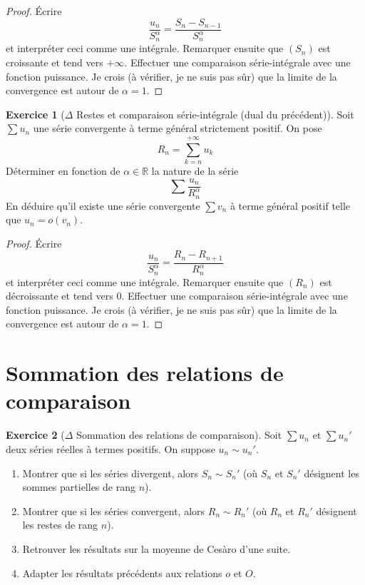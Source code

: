 \documentclass[french]{book}
\newcommand{\R}{\mathbb{R}}
\theoremstyle{definition}
\newtheorem{ex}{Exercice}[chapter]
\theoremstyle{theorem}
\theoremstyle{remark}
\begin{document}
\begin{proof}
	Écrire $$\frac{u_n}{S_n^\alpha}=\frac{S_n-S_{n-1}}{S_n^\alpha}$$ et interpréter ceci comme une intégrale. Remarquer ensuite que $(S_n)$ est croissante et tend vers $+\infty$. Effectuer une comparaison série-intégrale avec une fonction puissance. Je crois (à vérifier, je ne suis pas sûr) que la limite de la convergence est autour de $\alpha=1$.
\end{proof}

\begin{ex}[$\Delta$ Restes et comparaison série-intégrale (dual du précédent)]
	Soit $\sum u_n$ une série convergente à terme général strictement positif. On pose $$R_n=\sum_{k=n}^{+\infty}u_k$$ Déterminer en fonction de $\alpha\in\R$ la nature de la série $$\sum\frac{u_n}{R_n^\alpha}$$ En déduire qu'il existe une série convergente $\sum v_n$ à terme général positif telle que $u_n=o(v_n)$.
\end{ex}

\begin{proof}
	Écrire $$\frac{u_n}{S_n^\alpha}=\frac{R_n-R_{n+1}}{R_n^\alpha}$$ et interpréter ceci comme une intégrale. Remarquer ensuite que $(R_n)$ est décroissante et tend vers $0$. Effectuer une comparaison série-intégrale avec une fonction puissance. Je crois (à vérifier, je ne suis pas sûr) que la limite de la convergence est autour de $\alpha=1$.
\end{proof}

\section{Sommation des relations de comparaison}

\begin{ex}[$\Delta$ Sommation des relations de comparaison]
	Soit $\displaystyle\sum u_n$ et $\displaystyle \sum u_n'$ deux séries réelles à termes positifs. On suppose $u_n\sim u_n'$.
	\begin{enumerate}
		\item Montrer que si les séries divergent, alors $S_n\sim S_n'$ (où $S_n$ et $S_n'$ désignent les sommes partielles de rang $n$).
		\item Montrer que si les séries convergent, alors $R_n\sim R_n'$ (où $R_n$ et $R_n'$ désignent les restes de rang $n$).
		\item Retrouver les résultats sur la moyenne de Cesàro d'une suite.
		\item Adapter les résultats précédents aux relations $o$ et $O$.
	\end{enumerate}
\end{ex}
\end{document}
